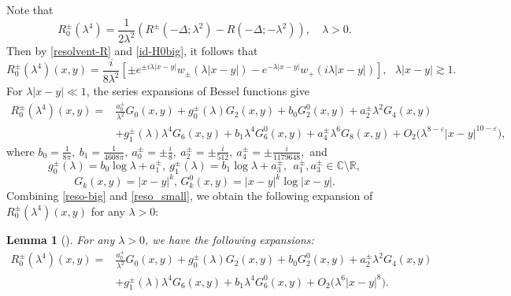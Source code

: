 \documentclass[reqno]{amsart}
\newtheorem{lemma}[theorem]{Lemma}
\numberwithin{equation}{section}
\begin{document}
Note that
\begin{equation*}
    R^\pm_0(\lambda^4) = \frac{1}{2\lambda^2} \left( R^\pm(-\Delta; \lambda^2) - R(-\Delta; -\lambda^2) \right), \quad \lambda > 0.
\end{equation*}
Then by \eqref{resolvent-R} and \eqref{id-H0big}, it follows that
\begin{equation}\label{reso-big}
    R_0^\pm(\lambda^4)(x,y) = \frac{i}{8\lambda^2} \left[ \pm e^{\pm i\lambda |x - y|} w_\pm(\lambda|x - y|) - e^{-\lambda |x - y|} w_+(i\lambda|x - y|) \right],\ \ \  \lambda|x - y| \gtrsim 1.
\end{equation}
 For $\lambda|x-y| \ll 1 $,  the series expansions of Bessel functions give
   \begin{equation}\label{reso_small}
   \begin{split}
    R^\pm_0(\lambda^4)(x,y)=&\frac{a_0^\pm}{\lambda^2}G_0(x,y)+g_0^\pm(\lambda)G_2(x,y)+b_0G_2^0(x,y)+a_2^\pm\lambda^2G_4(x,y)\\
&+g_1^\pm(\lambda)\lambda^4G_6(x,y)+b_1\lambda^4G_6^0(x,y)+a_4^\pm\lambda^6G_8(x,y)
    +O_2\bigl(\lambda^{8-\varepsilon}|x-y|^{10-\varepsilon}\bigr),
    \end{split}
    \end{equation}
where
$ b_0 = \frac{1}{8\pi}, \ b_1 = \frac{1}{4608\pi},\
a_0^\pm = \pm \frac{i}{8}, \  
a_2^\pm = \pm \frac{i}{512}, \      
a_4^\pm=\pm \frac{i}{1179648},$ and
$$
g_0^\pm(\lambda)=b_0\log\lambda+a_1^\pm, \ g_1^\pm(\lambda)=b_1\log\lambda+a_3^\pm,\ \ a_1^\pm, a_3^\pm\in\mathbb{C}\setminus\mathbb{R}, $$
\begin{equation}\label{def:G_k}
   G_{k}(x,y)= |x-y|^k, \,
   G_k^0(x,y)= |x-y|^k\log|x-y|.
\end{equation}
Combining \eqref{reso-big} and \eqref{reso_small}, we obtain the following expansion of $R^\pm_0(\lambda^4)(x,y)$ for any $\lambda > 0$:
\begin{lemma}[{\cite[Lemma 2.2]{LSY21}}]\label{lem-reso}
For any $\lambda> 0 $, we have the following expansions:
\begin{equation}\label{free-R0pmlambda4}
   \begin{split}
	  R^\pm_0(\lambda^4)(x,y)=&\frac{a_0^\pm}{\lambda^2}G_0(x,y)+g_0^\pm(\lambda)G_2(x,y)+b_0G_2^0(x,y)+a_2^\pm\lambda^2G_4(x,y)\\
&+g_1^\pm(\lambda)\lambda^4G_6(x,y)+b_1\lambda^4G_6^0(x,y)+O_2\bigl(\lambda^{6}|x-y|^{8}\bigr).\nonumber
		\end{split}
	\end{equation}
\end{lemma}
\end{document}
